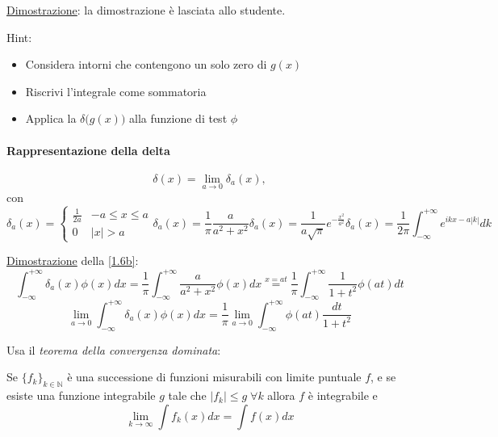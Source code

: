 \documentclass[a4paper,11pt]{report}
\begin{document}
\underline{Dimostrazione}: la dimostrazione \`e lasciata allo studente.

Hint:
\begin{itemize}
\item Considera intorni che contengono un solo zero di $g(x)$
\item Riscrivi l'integrale come sommatoria
\item Applica la $\delta\big(g(x)\big)$ alla funzione di test $\phi$
\end{itemize}

\paragraph{Rappresentazione della delta}
\[
\delta(x) = \lim_{a\to 0} \delta_a(x),
\]
con 
\begin{subequations}
\begin{equation}
\delta_a(x)=\begin{cases}
\frac{1}{2a} & -a \leq x \leq a \\
0 & |x| > a
\end{cases}
\label{1.6a}
\end{equation}
\begin{equation}
\delta_a(x) = \frac{1}{\pi}\frac{a}{a^2+x^2}
\label{1.6b}
\end{equation}
\begin{equation}
\delta_a(x) = \frac{1}{a\sqrt{\pi}} e^{-\frac{x^2}{a^2}}
\label{1.6c}
\end{equation}
\begin{equation}
\delta_a(x) = \frac{1}{2\pi} \int_{-\infty}^{+\infty} e^{ikx-a|k|}dk
\label{1.6d}
\end{equation}
\end{subequations}

\underline{Dimostrazione} della \eqref{1.6b}:
\[
\int_{-\infty}^{+\infty} \delta_a(x)\phi(x)dx=\frac{1}{\pi}\int_{-\infty}^{+\infty}\frac{a}{a^2+x^2}\phi(x)dx \overset{x=at}{=} \frac{1}{\pi}\int_{-\infty}^{+\infty}\frac{1}{1+t^2}\phi(at)dt
\]
\[
\lim_{a\to 0} \int_{-\infty}^{+\infty}\delta_a(x)\phi(x)dx=\frac{1}{\pi}\lim_{a\to 0}\int_{-\infty}^{+\infty}\phi(at)\frac{dt}{1+t^2}
\]

Usa il \emph{teorema della convergenza dominata}:

Se $\{f_k\}_{k\in\mathbb{N}}$ \`e una successione di funzioni misurabili con limite puntuale $f$, e se esiste una funzione integrabile $g$ tale che $|f_k|\leq g \; \forall k$ allora $f$ \`e integrabile e
\[
\lim_{k\to \infty}\int f_k(x) dx = \int f(x) dx
\]
\end{document}
